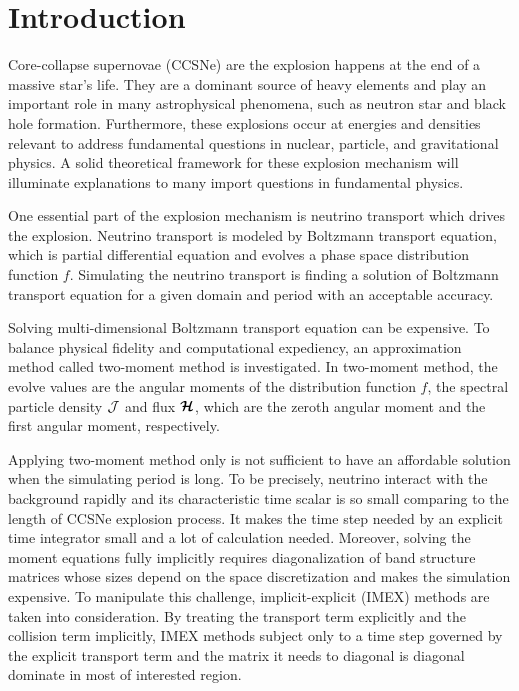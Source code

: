 \section{Introduction}

Core-collapse supernovae (CCSNe) are the explosion happens at the end of a massive star's life.
They are a dominant source of heavy elements and play an important role in many astrophysical phenomena, such as neutron star and black hole formation.  
Furthermore, these explosions occur at energies and densities relevant to address fundamental questions in nuclear, particle, and gravitational physics. 
A solid theoretical framework for these explosion mechanism will illuminate explanations to many import questions in fundamental physics.

One essential part of the explosion mechanism is neutrino transport which drives the explosion.  
Neutrino transport is modeled by Boltzmann transport equation, which is partial differential equation and evolves a phase space distribution function $f$.
Simulating the neutrino transport is finding a solution of Boltzmann transport equation for a given domain and period with an acceptable accuracy.

Solving multi-dimensional Boltzmann transport equation can be expensive.
To balance physical fidelity and computational expediency, an approximation method called two-moment method is investigated.
In two-moment method, the evolve values are the angular moments of the distribution function $f$, the spectral particle density $\mathcal{J}$ and flux $\boldsymbol{\mathcal{H}}$, which are the zeroth angular moment and the first angular moment, respectively.

Applying two-moment method only is not sufficient to have an affordable solution when the simulating period is long.
To be precisely, neutrino interact with the background rapidly and its characteristic time scalar is so small comparing to the length of CCSNe explosion process. 
It makes the time step needed by an explicit time integrator small and a lot of calculation needed. 
Moreover, solving the moment equations fully implicitly requires diagonalization of band structure matrices whose sizes depend on the space discretization and makes the simulation expensive.
To manipulate this challenge, implicit-explicit (IMEX) methods are taken into consideration.
By treating the transport term explicitly and the collision term implicitly, IMEX methods subject only to a time step governed by the explicit transport term and the matrix it needs to diagonal is diagonal dominate in most of interested region.  

